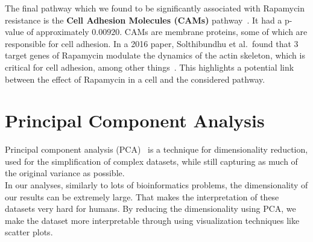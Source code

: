 The final pathway which we found to be significantly associated with Rapamycin resistance is the \textbf{Cell Adhesion Molecules (CAMs)} pathway~\cite{kegg_cam}. It had a p-value of approximately $0.00920$. CAMs are membrane proteins, some of which are responsible for cell adhesion. In a 2016 paper, Solthibundhu et al.\ found that 3 target genes of Rapamycin modulate the dynamics of the actin skeleton, which is critical for cell adhesion, among other things~\cite{rapamycin_cell_adhesion}. This highlights a potential link between the effect of Rapamycin in a cell and the considered pathway.

\section{Principal Component Analysis}\label{sec:pca}
Principal component analysis (PCA)~\cite{jolliffe_pca} is a technique for dimensionality reduction, used for the simplification of complex datasets, while still capturing as much of the original variance as possible.\\
In our analyses, similarly to lots of bioinformatics problems, the dimensionality of our results can be extremely large. That makes the interpretation of these datasets very hard for humans. By reducing the dimensionality using PCA, we make the dataset more interpretable through using visualization techniques like scatter plots.

